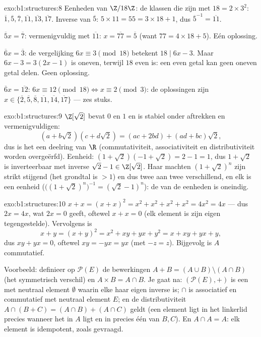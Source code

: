 \begin{solution}{exo:b1:structures:8}
Eenheden van $\Z/18\Z$: de klassen die  zijn met $18 = 2
\times 3^2$: $\overline 1, \overline 5, \overline 7, \overline{11},
\overline{13}, \overline{17}$. Inverse van $\overline 5$: $5 \times 11 =
55 = 3\times 18 + 1$, dus $\overline 5^{-1} = \overline{11}$.

$\overline 5 x = \overline 7$: vermenigvuldig met $\overline{11}$: $x =
\overline{77} = \overline 5$ (want $77 = 4\times 18 + 5$). Eén oplossing.

$\overline 6 x = \overline 3$: de vergelijking $6x \equiv 3 \pmod{18}$
betekent $18 \mid 6x - 3$. Maar $6x - 3 = 3(2x - 1)$ is oneven, terwijl
$18$ even is: een even getal kan geen oneven getal delen. Geen oplossing.

$\overline 6 x = \overline{12}$: $6x \equiv 12 \pmod{18} \iff x \equiv 2
\pmod 3$: de oplossingen zijn $x \in \{\overline 2, \overline 5, \overline
8, \overline{11}, \overline{14}, \overline{17}\}$ --- zes stuks.
\end{solution}

\begin{solution}{exo:b1:structures:9}
$\Z[\sqrt 2]$ bevat $0$ en $1$ en is stabiel onder aftrekken en
vermenigvuldigen:
\[
(a + b\sqrt 2)(c + d\sqrt 2) = (ac + 2bd) + (ad + bc)\sqrt 2 ,
\]
dus is het een deelring van $\R$ (commutativiteit, associativiteit en
distributiviteit worden overgeërfd). Eenheid: $(1 + \sqrt 2)(-1 + \sqrt
2) = 2 - 1 = 1$, dus $1 + \sqrt 2$ is inverteerbaar met inverse $\sqrt 2
- 1 \in \Z[\sqrt 2]$. Haar machten $(1 + \sqrt 2)^n$ zijn strikt stijgend
(het grondtal is $> 1$) en dus twee aan twee verschillend, en elk is een
eenheid ($\bigl((1+\sqrt2)^n\bigr)^{-1} = (\sqrt 2 - 1)^n$): de  van
de eenheden is oneindig.
\end{solution}

\begin{solution}{exo:b1:structures:10}
$x + x = (x + x)^2 = x^2 + x^2 + x^2 + x^2 = 4x^2 = 4x$ --- dus $2x = 4x$,
wat $2x = 0$ geeft, oftewel $x + x = 0$ (elk element is zijn eigen
tegengestelde). Vervolgens is
\[
x + y = (x+y)^2 = x^2 + xy + yx + y^2 = x + xy + yx + y ,
\]
dus $xy + yx = 0$, oftewel $xy = -yx = yx$ (met $-z = z$). Bijgevolg is
$A$ commutatief.

Voorbeeld: definieer op $\mathcal{P}(E)$ de bewerkingen $A + B = (A \cup
B) \setminus (A \cap B)$ (het symmetrisch verschil) en $A \times B = A
\cap B$. Je gaat na: $(\mathcal{P}(E), +)$ is een  met
neutraal element $\emptyset$ waarin elke  haar eigen inverse
is; $\cap$ is associatief en commutatief met neutraal element $E$; en de
distributiviteit $A \cap (B + C) = (A \cap B) + (A \cap C)$ geldt (een
element ligt in het linkerlid precies wanneer het in $A$ ligt en in
precies één van $B, C$). En $A \cap A = A$: elk element is idempotent,
zoals gevraagd.
\end{solution}

